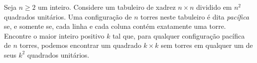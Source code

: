Seja $n \ge 2$ um inteiro. Considere um tabuleiro de xadrez $n \times n$ dividido em $n^2$ quadrados unitários. Uma configuração de $n$ torres neste tabuleiro é dita \emph{pacífica} se, e somente se, cada linha e cada coluna contém exatamente uma torre. Encontre o maior inteiro positivo $k$ tal que, para qualquer configuração pacífica de $n$ torres, podemos encontrar um quadrado $k \times k$ sem torres em qualquer um de seus $k^2$ quadrados unitários.
